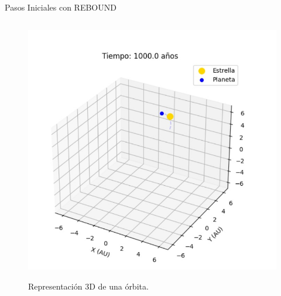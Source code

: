 \begin{frame}{Pasos Iniciales con REBOUND}
\begin{columns}[T]
        \begin{column}{0.38\textwidth}
            \begin{figure}
                \centering
                \href{run:C:/Users/emicr/Documents/ESCOLARES/ESCOM/TRABAJO TERMINAL/Presentacion/img/Familiarizacion/trayectoria.gif}{%
                \includegraphics[width=\textwidth]{img/conclusion/simulacion.jpeg}
                    }
                \caption{Representación 3D de una órbita.}
            \end{figure}
        \end{column}
    \end{columns}
\end{frame}